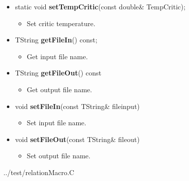 \begin{itemize}
\begin{itemize}
  \item[] static void \textbf{setTempCritic}(const double\& \textunderscore TempCritic);
    \begin{itemize}
    \item[] Set critic temperature.
    \end{itemize}

  \item[] TString \textbf{getFileIn}() const;
    \begin{itemize}
    \item[] Get input file name.
    \end{itemize}

  \item[] TString \textbf{getFileOut}() const
    \begin{itemize}
    \item[] Get output file name.
    \end{itemize}

  \item[]  void \textbf{setFileIn}(const TString\& file\textunderscore input)
    \begin{itemize}
    \item[] Set input file name.
    \end{itemize}

  \item[] void \textbf{setFileOut}(const TString\& file\textunderscore out)
    \begin{itemize}
    \item[] Set output file name.
    \end{itemize}

  \end{itemize}
\end{itemize}


{../test/relationMacro.C}
